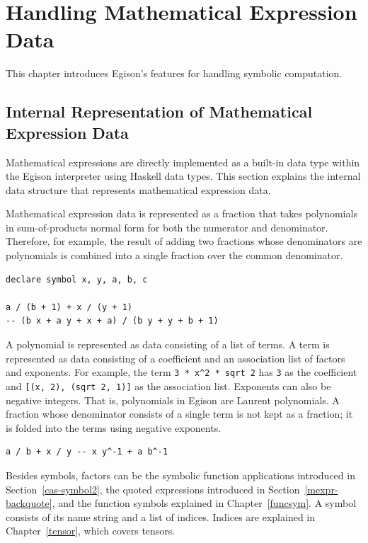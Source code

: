 \chapter{Handling Mathematical Expression Data}\label{mexpr}

This chapter introduces Egison's features for handling symbolic computation.

\section{Internal Representation of Mathematical Expression Data}\label{mexpr-expr}

Mathematical expressions are directly implemented as a built-in data type within the Egison interpreter using Haskell data types.
This section explains the internal data structure that represents mathematical expression data.

Mathematical expression data is represented as a fraction that takes polynomials in sum-of-products normal form for both the numerator and denominator.
Therefore, for example, the result of adding two fractions whose denominators are polynomials is combined into a single fraction over the common denominator.
\begin{lstlisting}[language=egison,numbers=none]
declare symbol x, y, a, b, c

a / (b + 1) + x / (y + 1)
-- (b x + a y + x + a) / (b y + y + b + 1)
\end{lstlisting}
A polynomial is represented as data consisting of a list of terms.
A term is represented as data consisting of a coefficient and an association list of factors and exponents.
For example, the term \lstinline{3 * x^2 * sqrt 2} has \lstinline{3} as the coefficient and \lstinline{[(x, 2), (sqrt 2, 1)]} as the association list.
Exponents can also be negative integers.
That is, polynomials in Egison are Laurent polynomials.
A fraction whose denominator consists of a single term is not kept as a fraction; it is folded into the terms using negative exponents.
\begin{lstlisting}[language=egison,numbers=none]
a / b + x / y -- x y^-1 + a b^-1
\end{lstlisting}

Besides symbols, factors can be the symbolic function applications introduced in Section~\ref{cas-symbol2}, the quoted expressions introduced in Section~\ref{mexpr-backquote}, and the function symbols explained in Chapter~\ref{funcsym}.
A symbol consists of its name string and a list of indices.
Indices are explained in Chapter~\ref{tensor}, which covers tensors.

